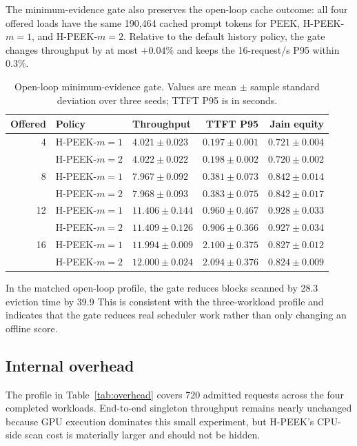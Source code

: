 \documentclass[10pt,twocolumn]{article}
\begin{document}
The minimum-evidence gate also preserves the open-loop cache outcome: all four
offered loads have the same 190,464 cached prompt tokens for PEEK, H-PEEK-$m{=}1$,
and H-PEEK-$m{=}2$. Relative to the default history policy, the gate changes
throughput by at most $+0.04\%$ and keeps the 16-request/s P95 within 0.3\%.

\begin{table}[t]
  \centering
  \small
  \caption{Open-loop minimum-evidence gate. Values are mean $\pm$ sample
  standard deviation over three seeds; TTFT P95 is in seconds.}
  \label{tab:open-loop-gate}
  \begin{tabular}{rllrr}
    \toprule
    Offered & Policy & Throughput & TTFT P95 & Jain equity \\
    \midrule
    4  & H-PEEK-$m{=}1$ & $4.021\pm0.023$ & $0.197\pm0.001$ & $0.721\pm0.004$ \\
       & H-PEEK-$m{=}2$ & $4.022\pm0.022$ & $0.198\pm0.002$ & $0.720\pm0.002$ \\
    8  & H-PEEK-$m{=}1$ & $7.967\pm0.092$ & $0.381\pm0.073$ & $0.842\pm0.014$ \\
       & H-PEEK-$m{=}2$ & $7.968\pm0.093$ & $0.383\pm0.075$ & $0.842\pm0.017$ \\
    12 & H-PEEK-$m{=}1$ & $11.406\pm0.144$ & $0.960\pm0.467$ & $0.928\pm0.033$ \\
       & H-PEEK-$m{=}2$ & $11.409\pm0.126$ & $0.906\pm0.366$ & $0.927\pm0.034$ \\
    16 & H-PEEK-$m{=}1$ & $11.994\pm0.009$ & $2.100\pm0.375$ & $0.827\pm0.012$ \\
       & H-PEEK-$m{=}2$ & $12.000\pm0.024$ & $2.094\pm0.376$ & $0.824\pm0.009$ \\
    \bottomrule
  \end{tabular}
\end{table}

In the matched open-loop profile, the gate reduces blocks scanned by 28.3%
eviction time by 39.9%
This is consistent with the three-workload profile and indicates that the gate
reduces real scheduler work rather than only changing an offline score.

\subsection{Internal overhead}

The profile in Table~\ref{tab:overhead} covers 720 admitted requests across the
four completed workloads. End-to-end singleton throughput remains nearly
unchanged because GPU execution dominates this small experiment, but H-PEEK's
CPU-side scan cost is materially larger and should not be hidden.
\end{document}
